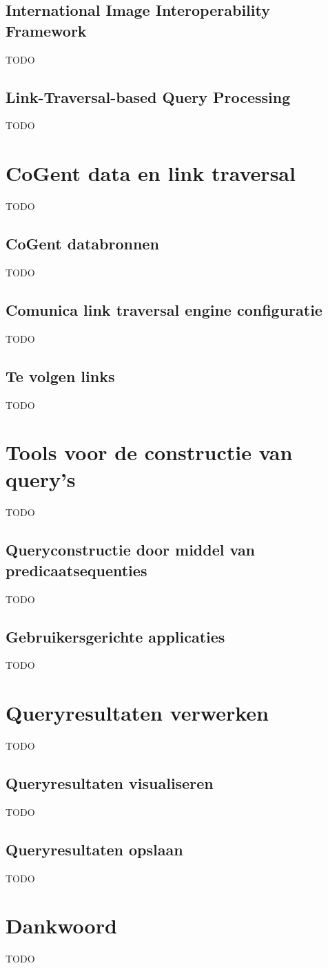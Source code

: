 \documentclass[conference]{IEEEtran}
\begin{document}
\subsection{International Image Interoperability Framework}
TODO

\subsection{Link-Traversal-based Query Processing}
TODO

\section{CoGent data en link traversal}
TODO

\subsection{CoGent databronnen}
TODO

\subsection{Comunica link traversal engine configuratie}
TODO

\subsection{Te volgen links}
TODO

\section{Tools voor de constructie van query's}
TODO

\subsection{Queryconstructie door middel van predicaatsequenties}
TODO

\subsection{Gebruikersgerichte applicaties}
TODO

\section{Queryresultaten verwerken}
TODO

\subsection{Queryresultaten visualiseren}
TODO

\subsection{Queryresultaten opslaan}
TODO

\section*{Dankwoord}
TODO



\end{document}
